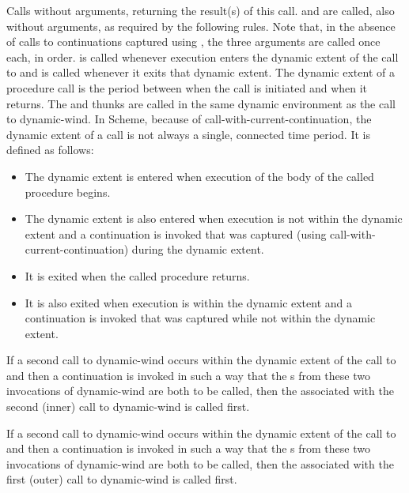 \begin{entry}{
}

Calls  without arguments, returning the result(s) of this call.
 and  are called, also without arguments, as required
by the following rules.  Note that, in the absence of calls to continuations
captured using , the three arguments are
called once each, in order.   is called whenever execution
enters the dynamic extent of the call to  and  is called
whenever it exits that dynamic extent.  The dynamic extent of a procedure
call is the period between when the call is initiated and when it
returns.
The  and  thunks are called in the same dynamic
environment as the call to {\cf dynamic-wind}.
In Scheme, because of {\cf call-with-current-continuation}, the
dynamic extent of a call is not always a single, connected time period.
It is defined as follows:
\begin{itemize}
\item The dynamic extent is entered when execution of the body of the
called procedure begins.

\item The dynamic extent is also entered when execution is not within
the dynamic extent and a continuation is invoked that was captured
(using {\cf call-with-current-continuation}) during the dynamic extent.

\item It is exited when the called procedure returns.

\item It is also exited when execution is within the dynamic extent and
a continuation is invoked that was captured while not within the
dynamic extent.
\end{itemize}

If a second call to {\cf dynamic-wind} occurs within the dynamic extent of the
call to  and then a continuation is invoked in such a way that the
s from these two invocations of {\cf dynamic-wind} are both to be
called, then the  associated with the second (inner) call to
{\cf dynamic-wind} is called first.

If a second call to {\cf dynamic-wind} occurs within the dynamic extent of the
call to  and then a continuation is invoked in such a way that the
s from these two invocations of {\cf dynamic-wind} are both to be
called, then the  associated with the first (outer) call to
{\cf dynamic-wind} is called first.


\end{entry}
